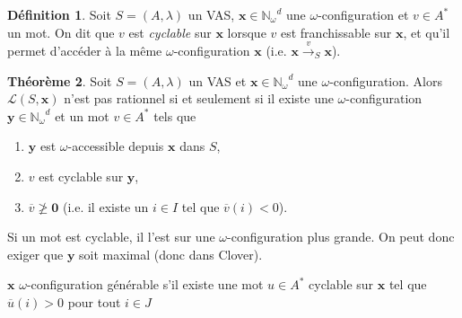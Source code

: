 \documentclass[a4paper,final]{article}
\theoremstyle{definition}
\newtheorem{Theorem}{Théorème}
\newtheorem{Definition}[Theorem]{Définition}
\let\geq\geqslant
\newcommand{\eqfin}{\ensuremath{=_\text{fin}}}
\newcommand{\N}{\ensuremath{\mathbb{N}}}
\newcommand{\Nomega}{\ensuremath{\mathbb{N}_\omega}}
\newcommand{\lang}{\ensuremath{\mathcal{L}}}
\newcommand{\trans}[2]{\ensuremath{\stackrel{#1}{\longrightarrow}_{#2}}}
\newcommand{\vect}[1]{\ensuremath{\mathbf{#1}}}
\newcommand{\valeur}[1]{\ensuremath{\overline{#1}}}
\newcommand{\Jinf}[1]{J^\text{inf}_{#1}}
\begin{document}

\begin{Definition}
Soit $S = (A,\lambda)$ un VAS, $\vect{x}\in\Nomega^d$ une $\omega$-configuration et $v\in A^*$ un mot.
On dit que $v$ est \emph{cyclable} sur $\vect{x}$ lorsque $v$ est franchissable sur $\vect{x}$, et qu'il permet d'accéder à la même $\omega$-configuration $\vect{x}$ (i.e. $\vect{x} \trans{v}{S} \vect{x}$).
\end{Definition}

\begin{Theorem}
Soit $S = (A,\lambda)$ un VAS et $\vect{x}\in\Nomega^d$ une $\omega$-configuration.
Alors $\lang(S,\vect{x})$ n'est pas rationnel si et seulement si
il existe une $\omega$-configuration $\vect{y}\in\Nomega^d$ et un mot $v\in A^*$ tels que
\begin{enumerate}
    \item $\vect{y}$ est $\omega$-accessible depuis $\vect{x}$ dans $S$,
    \item $v$ est cyclable sur $\vect{y}$,
    \item $\valeur{v} \not\geq \vect{0}$ (i.e. il existe un $i\in I$ tel que $\valeur{v}(i)<0$).
\end{enumerate}
\end{Theorem}


Si un mot est cyclable, il l'est sur une $\omega$-configuration plus grande.
On peut donc exiger que $\vect{y}$ soit maximal (donc dans Clover).

$\vect{x}$ $\omega$-configuration générable s'il existe une mot $u\in A^*$ cyclable sur $\vect{x}$ tel que $\valeur{u}(i) > 0$ pour tout $i\in J$ %

\end{document}
